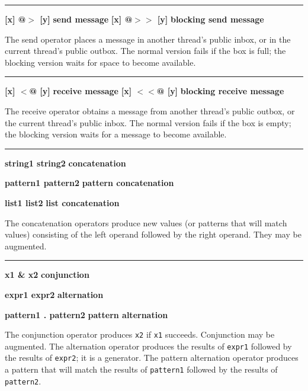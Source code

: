 \bigskip\hrule\vspace{0.1cm}
\noindent
{\bf [x] @$>$ [y] } \hfill {\bf send message}
 \linebreak
\noindent
{\bf [x] @$>>$ [y] } \hfill {\bf blocking send message}

\noindent
The send operator places a message in another thread's public
inbox, or in the current thread's public outbox. The normal version fails
if the box is full; the blocking version waits for space to become
available.

\bigskip\hrule\vspace{0.1cm}
\noindent
{\bf [x] $<$@ [y] } \hfill {\bf receive message}
 \linebreak
\noindent
{\bf [x] $<<$@ [y] } \hfill {\bf blocking receive message}

\noindent
The receive operator obtains a message from another thread's public
outbox, or the current thread's public inbox. The normal version fails
if the box is empty; the blocking version waits for a message to become
available.

\bigskip\hrule\vspace{0.1cm}
\noindent
{\bf string1 {\textbar}{\textbar} string2 } \hfill {\bf concatenation}

\noindent
{\bf pattern1 {\textbar}{\textbar} pattern2 } \hfill {\bf pattern concatenation}

\noindent
{\bf list1 {\textbar}{\textbar}{\textbar} list2 } \hfill {\bf list concatenation}

\noindent
The concatenation operators produce new values
(or patterns that will match values)
consisting of the left operand followed by the right
operand. They may be augmented.

\bigskip\hrule\vspace{0.1cm}
\noindent
{\bf x1 \& x2 } \hfill {\bf conjunction}

\noindent
{\bf expr1 {\textbar} expr2 } \hfill {\bf alternation}

\noindent
{\bf pattern1 .{\textbar} pattern2 } \hfill {\bf pattern alternation}

\noindent
The conjunction operator produces \texttt{x2} if
\texttt{x1} succeeds. Conjunction may be augmented.
The 
alternation operator produces the results of \texttt{expr1} followed
by the results of \texttt{expr2}; it is a generator.
The 
pattern alternation operator produces a pattern that will match
the results of \texttt{pattern1} followed
by the results of \texttt{pattern2}.


